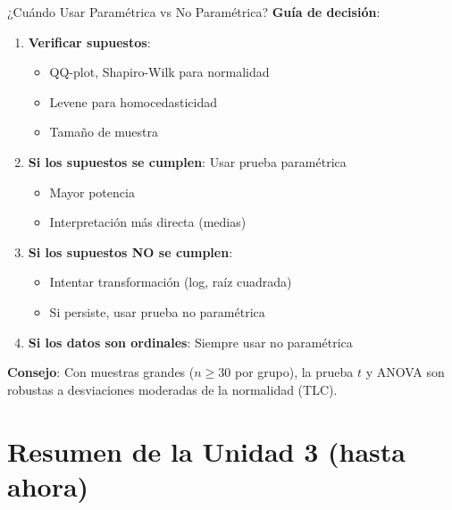 \documentclass[aspectratio=169, 11pt]{beamer}
\begin{document}
\begin{frame}{¿Cuándo Usar Paramétrica vs No Paramétrica?}
\textbf{Guía de decisión}:

\vspace{0.3cm}
\begin{enumerate}
  \item \textbf{Verificar supuestos}:
  \begin{itemize}
    \item QQ-plot, Shapiro-Wilk para normalidad
    \item Levene para homocedasticidad
    \item Tamaño de muestra
  \end{itemize}

  \item \textbf{Si los supuestos se cumplen}: Usar prueba paramétrica
  \begin{itemize}
    \item Mayor potencia
    \item Interpretación más directa (medias)
  \end{itemize}

  \item \textbf{Si los supuestos NO se cumplen}:
  \begin{itemize}
    \item Intentar transformación (log, raíz cuadrada)
    \item Si persiste, usar prueba no paramétrica
  \end{itemize}

  \item \textbf{Si los datos son ordinales}: Siempre usar no paramétrica
\end{enumerate}

\vspace{0.3cm}
\textbf{Consejo}: Con muestras grandes ($n \geq 30$ por grupo), la prueba $t$ y ANOVA son \alert{robustas} a desviaciones moderadas de la normalidad (TLC).
\end{frame}

\section{Resumen de la Unidad 3 (hasta ahora)}
\end{document}
